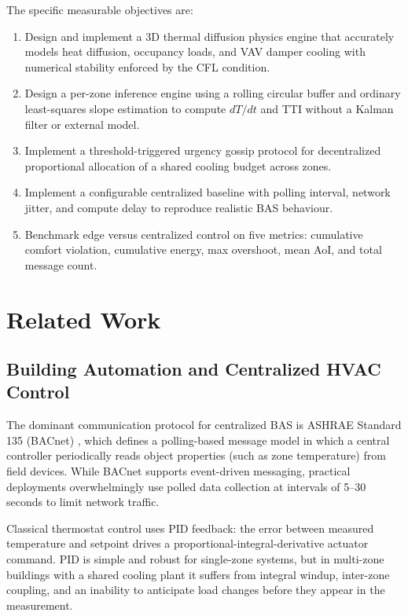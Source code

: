 \documentclass[conference]{IEEEtran}
\begin{document}
The specific measurable objectives are:
\begin{enumerate}[]
  \item Design and implement a 3D thermal diffusion physics engine that
        accurately models heat diffusion, occupancy loads, and VAV damper
        cooling with numerical stability enforced by the CFL condition.
  \item Design a per-zone inference engine using a rolling circular buffer
        and ordinary least-squares slope estimation to compute $dT/dt$ and
        TTI without a Kalman filter or external model.
  \item Implement a threshold-triggered urgency gossip protocol for
        decentralized proportional allocation of a shared cooling budget
        across zones.
  \item Implement a configurable centralized baseline with polling interval,
        network jitter, and compute delay to reproduce realistic BAS
        behaviour.
  \item Benchmark edge versus centralized control on five metrics: cumulative
        comfort violation, cumulative energy, max overshoot, mean AoI, and
        total message count.
\end{enumerate}

\section{Related Work}

\subsection{Building Automation and Centralized HVAC Control}

The dominant communication protocol for centralized BAS is ASHRAE Standard
135 (BACnet) \cite{ashrae2017}, which defines a polling-based message model
in which a central controller periodically reads object properties (such as
zone temperature) from field devices.  While BACnet supports event-driven
messaging, practical deployments overwhelmingly use polled data collection at
intervals of 5--30 seconds to limit network traffic.

Classical thermostat control uses PID feedback: the error between measured
temperature and setpoint drives a proportional-integral-derivative actuator
command.  PID is simple and robust for single-zone systems, but in multi-zone
buildings with a shared cooling plant it suffers from integral windup,
inter-zone coupling, and an inability to anticipate load changes before they
appear in the measurement.
\end{document}
